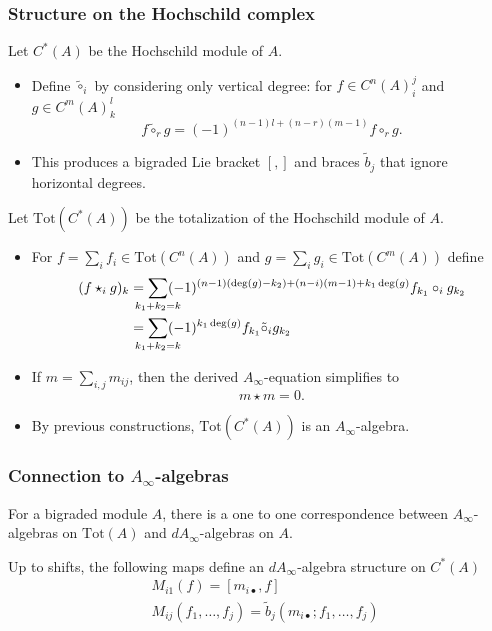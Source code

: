 \documentclass{beamer}
\theoremstyle{definition}
\newcommand{\Tot}{\mathrm{Tot}}
\begin{document}
\begin{frame}
\frametitle{Structure on the Hochschild complex}
Let $C^*(A)$ be the Hochschild module of $A$.
\begin{itemize}
\item<1-> Define $\tilde{\circ}_i$ by considering only vertical degree: for $f\in C^n(A)^j_i$ and $g\in C^m(A)^l_k$
\[f\tilde{\circ}_rg=(-1)^{(n-1)l+(n-r)(m-1)}f\circ_r g.\]
\item<2-> This produces a bigraded Lie bracket $[,]$ and braces $\tilde{b}_j$ that ignore horizontal degrees.

\end{itemize}
\end{frame}
\begin{frame}

Let $\Tot(C^*(A))$ be the totalization of the Hochschild module of $A$.
\begin{itemize}
\item<1-> For $f=\sum_i f_i\in \Tot(C^n(A))$ and $g=\sum_i g_i\in \Tot(C^m(A))$ define %
\begin{align*}
(f\star_ig)_k&=\sum_{\mathclap{k_1+k_2=k}} (-1)^{(n-1)(\deg(g)-k_2)+(n-i)(m-1)+k_1\deg(g)}f_{k_1}\circ_i g_{k_2}\\
             &= \sum_{\mathclap{k_1+k_2=k}} (-1)^{k_1\deg(g)}f_{k_1}\tilde{\circ}_i g_{k_2}
\end{align*}

\item<2-> If $m=\sum_{i,j} m_{ij}$, then the derived $A_\infty$-equation simplifies to 
\[m\star m = 0.\]
\item<3-> By previous constructions, $\Tot(C^*(A))$ is an $A_\infty$-algebra.
\end{itemize}
\end{frame}


\begin{frame}
\frametitle{Connection to $A_\infty$-algebras}
\begin{theorem}
For a bigraded module $A$, there is a one to one correspondence between $A_\infty$-algebras on $\Tot(A)$ and $dA_\infty$-algebras on $A$.
\end{theorem}\pause
\begin{corollary}
Up to shifts, the following maps define an $dA_\infty$-algebra structure on $C^*(A)$
\begin{align*}
&M_{i1}(f)=[m_{i\bullet},f]\\
&M_{ij}(f_1,\dots, f_j)=\tilde{b}_j(m_{i\bullet};f_1,\dots, f_j)
\end{align*}
\end{corollary}

\end{frame}
\end{document}
